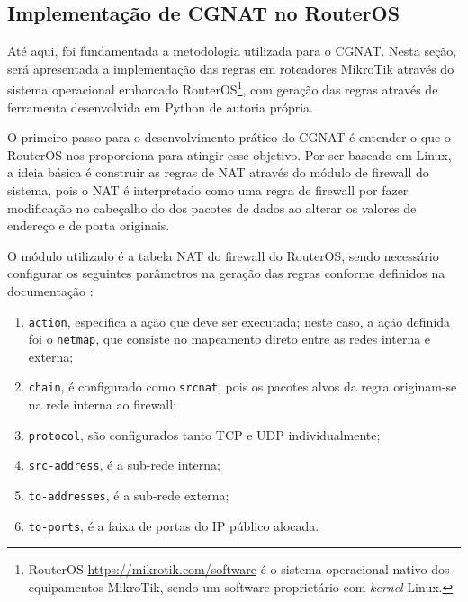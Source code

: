 \subsection{Implementação de CGNAT no RouterOS}

    Até aqui, foi fundamentada a metodologia utilizada para o CGNAT. Nesta seção, será apresentada a implementação das regras em roteadores MikroTik através do sistema operacional embarcado RouterOS\footnote{RouterOS \url{https://mikrotik.com/software} é o sistema operacional nativo dos equipamentos MikroTik, sendo um software proprietário com \textit{kernel} Linux.}, com geração das regras através de ferramenta desenvolvida em Python de autoria própria.
    
    
    O primeiro passo para o desenvolvimento prático do CGNAT é entender o que o RouterOS nos proporciona para atingir esse objetivo. Por ser baseado em Linux, a ideia básica é construir as regras de NAT através do módulo de firewall do sistema, pois o NAT é interpretado como uma regra de firewall por fazer modificação no cabeçalho do dos pacotes de dados ao alterar os valores de endereço e de porta originais.

    O módulo utilizado é a tabela NAT do firewall do RouterOS, sendo necessário configurar os seguintes parâmetros na geração das regras conforme definidos na documentação \cite{natmikrotik}:

    \begin{enumerate}[label=\alph*)]
        \item \label{nat:action} {\tt action}, especifica a ação que deve ser executada; neste caso, a ação definida foi o {\tt netmap}, que consiste no mapeamento direto entre as redes interna e externa;
        
        \item \label{nat:chain} {\tt chain}, é configurado como {\tt srcnat}, pois os pacotes alvos da regra originam-se na rede interna ao firewall; 
        
        \item \label{nat:protocol} {\tt protocol}, são configurados tanto TCP e UDP individualmente; 
        
        \item \label{nat:srcaddress} {\tt src-address}, é a sub-rede interna;
        
        \item \label{nat:toaddress} {\tt to-addresses}, é a sub-rede externa;
        
        \item \label{nat:toports} {\tt to-ports}, é a faixa de portas do IP público alocada.
    \end{enumerate}

